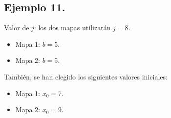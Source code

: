 \documentclass[10pt]{IEEEtran}
\begin{document}
\subsection{Ejemplo 11.}
Valor de $j$: los dos mapas utilizarán $j=8$. 

\begin{itemize}
\item Mapa 1: $b =  5$.
\item Mapa 2: $b =  5$.
\end{itemize}

También, se han elegido los siguientes valores iniciales:

\begin{itemize}
\item Mapa 1: $x_{0} = 7$.
\item Mapa 2: $x_{0} = 9$.
\end{itemize}
\end{document}
